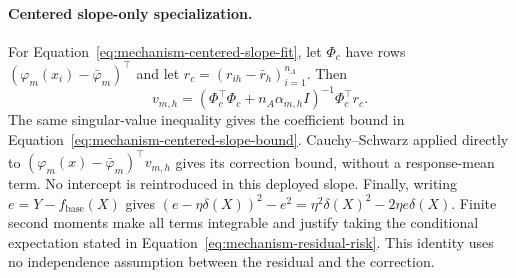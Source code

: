 \paragraph{Centered slope-only specialization.}
For Equation~\eqref{eq:mechanism-centered-slope-fit}, let $\Phi_c$
have rows $(\varphi_m(x_i)-\bar\varphi_m)^\top$ and let
$r_c=(r_{ih}-\bar r_h)_{i=1}^{n_A}$. Then
\[
 v_{m,h}=(\Phi_c^\top\Phi_c+n_A\alpha_{m,h}I)^{-1}\Phi_c^\top r_c.
\]
The same singular-value inequality gives the coefficient bound in
Equation~\eqref{eq:mechanism-centered-slope-bound}.
Cauchy--Schwarz applied directly to
$(\varphi_m(x)-\bar\varphi_m)^\top v_{m,h}$ gives its correction
bound, without a response-mean term. No intercept is reintroduced in
this deployed slope. Finally, writing
$e=Y-f_{\mathrm{base}}(X)$ gives
$(e-\eta\delta(X))^2-e^2=\eta^2\delta(X)^2-2\eta e\delta(X)$.
Finite second moments make all terms integrable and justify taking the
conditional expectation stated in
Equation~\eqref{eq:mechanism-residual-risk}. This identity uses no
independence assumption between the residual and the correction.
